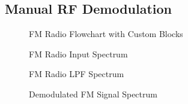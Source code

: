 \documentclass{article}
\begin{document}
\subsection{Manual RF Demodulation}

\begin{figure}[H]
	\centerline{}
	\caption{FM Radio Flowchart with Custom Blocks}
	\label{fig::fm_radio_user_flowchart}
\end{figure}

\begin{figure}[H]
	\centerline{}
	\caption{FM Radio Input Spectrum}
	\label{fig::fm_radio_user_input_spectrum}
\end{figure}

\begin{figure}[H]
	\centerline{}
	\caption{FM Radio LPF Spectrum}
	\label{fig::fm_radio_user_lpf_spectrum}
\end{figure}

\begin{figure}[H]
	\centerline{}
	\caption{Demodulated FM Signal Spectrum}
	\label{fig::fm_radio_user_demod_spectrum}
\end{figure}
\end{document}
